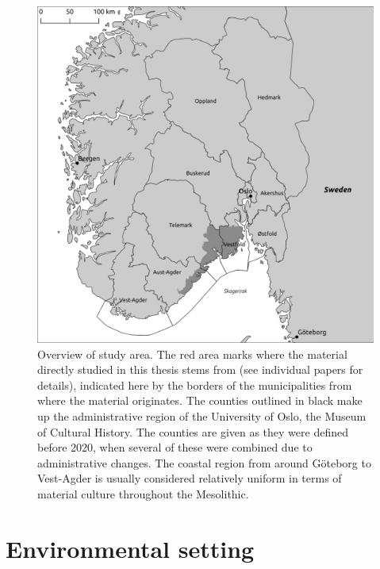 \documentclass[
  12pt,
  a4paper,
  oneside]{book}
\begin{document}
\begin{figure}

{\centering \includegraphics[width=0.95\linewidth]{figures/overview} 

}

\caption{Overview of study area. The red area marks where the material directly studied in this thesis stems from (see individual papers for details), indicated here by the borders of the municipalities from where the material originates. The counties outlined in black make up the administrative region of the University of Oslo, the Museum of Cultural History. The counties are given as they were defined before 2020, when several of these were combined due to administrative changes. The coastal region from around Göteborg to Vest-Agder is usually considered relatively uniform in terms of material culture throughout the Mesolithic.}\label{fig:overview}
\end{figure}

\hypertarget{environmental-setting}{%
\section{Environmental setting}\label{environmental-setting}}
\end{document}
